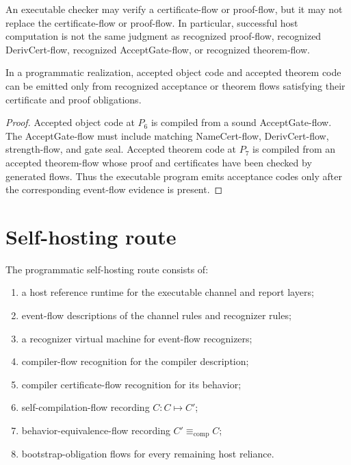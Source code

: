 \begin{principle}
\label{prin:programmatic-programs-check-certificates}
An executable checker may verify a certificate-flow or proof-flow, but it may not replace the certificate-flow or proof-flow. In particular, successful host computation is not the same judgment as recognized proof-flow, recognized DerivCert-flow, recognized AcceptGate-flow, or recognized theorem-flow.
\end{principle}

\begin{proposition}
\label{prop:programmatic-acceptance-certificate-mediated}
In a programmatic realization, accepted object code and accepted theorem code can be emitted only from recognized acceptance or theorem flows satisfying their certificate and proof obligations.
\end{proposition}

\begin{proof}
Accepted object code at $P_6$ is compiled from a sound AcceptGate-flow. The AcceptGate-flow must include matching NameCert-flow, DerivCert-flow, strength-flow, and gate seal. Accepted theorem code at $P_7$ is compiled from an accepted theorem-flow whose proof and certificates have been checked by generated flows. Thus the executable program emits acceptance codes only after the corresponding event-flow evidence is present.
\end{proof}

\section{Self-hosting route}
\label{sec:programmatic-self-hosting-route}

\begin{definition}
\label{def:programmatic-self-hosting-route}
The programmatic self-hosting route consists of:
\begin{enumerate}
\item a host reference runtime for the executable channel and report layers;
\item event-flow descriptions of the channel rules and recognizer rules;
\item a recognizer virtual machine for event-flow recognizers;
\item compiler-flow recognition for the compiler description;
\item compiler certificate-flow recognition for its behavior;
\item self-compilation-flow recording $C:C\mapsto C'$;
\item behavior-equivalence-flow recording $C'\equiv_{\mathrm{comp}}C$;
\item bootstrap-obligation flows for every remaining host reliance.
\end{enumerate}
\end{definition}

